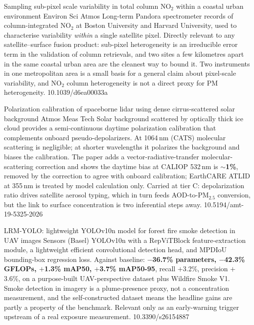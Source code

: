 \documentclass[10pt]{article}
\begin{document}
{Sampling sub-pixel scale variability in total column NO$_2$ within a coastal urban environment}
{Environ Sci Atmos}
{Long-term Pandora spectrometer records of column-integrated NO$_2$ at Boston University
and Harvard University, used to characterise variability \emph{within} a single satellite
pixel. Directly relevant to any satellite--surface fusion product: sub-pixel
heterogeneity is an irreducible error term in the validation of column retrievals, and
two sites a few kilometres apart in the same coastal urban area are the cleanest way to
bound it. Two instruments in one metropolitan area is a small basis for a general claim
about pixel-scale variability, and NO$_2$ column heterogeneity is not a direct proxy for
PM heterogeneity.}
{10.1039/d6ea00033a}

{Polarization calibration of spaceborne lidar using dense cirrus-scattered solar background}
{Atmos Meas Tech}
{Solar background scattered by optically thick ice cloud provides a semi-continuous
daytime polarization calibration that complements onboard pseudo-depolarizers. At 1064\,nm
(CATS) molecular scattering is negligible; at shorter wavelengths it polarizes the
background and biases the calibration. The paper adds a vector-radiative-transfer
molecular-scattering correction and shows the daytime bias at CALIOP 532\,nm is
\textbf{$\sim$1\%}, removed by the correction to agree with onboard calibration; EarthCARE
ATLID at 355\,nm is treated by model calculation only. Carried at tier C: depolarization
ratio drives satellite aerosol typing, which in turn feeds AOD-to-PM$_{2.5}$ conversion,
but the link to surface concentration is two inferential steps away.}
{10.5194/amt-19-5325-2026}

{LRM-YOLO: lightweight YOLOv10n model for forest fire smoke detection in UAV images}
{Sensors (Basel)}
{YOLOv10n with a RepViTBlock feature-extraction module, a lightweight efficient
convolutional detection head, and MPDIoU bounding-box regression loss. Against baseline:
\textbf{$-$36.7\% parameters, $-$42.3\% GFLOPs, $+$1.3\% mAP50, $+$3.7\% mAP50-95},
recall $+$3.2\%, precision $+$3.6\%, on a purpose-built UAV-perspective dataset plus
Wildfire Smoke V1. Smoke detection in imagery is a plume-presence proxy, not a
concentration measurement, and the self-constructed dataset means the headline gains are
partly a property of the benchmark. Relevant only as an early-warning trigger upstream of
a real exposure measurement.}
{10.3390/s26154887}
\end{document}
